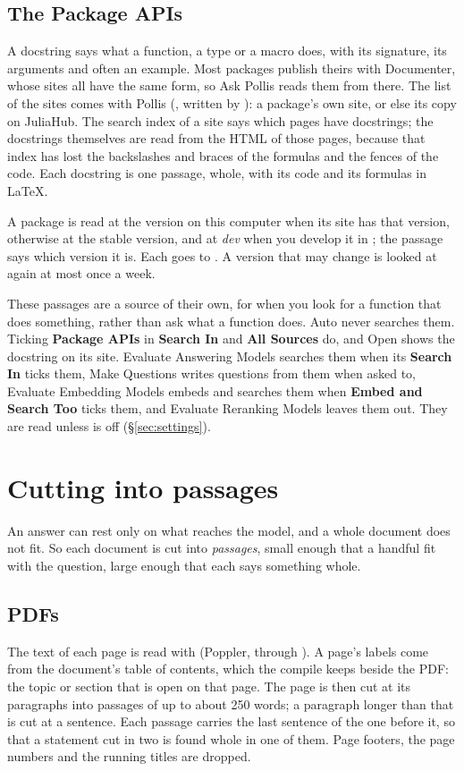 \subsection{The Package APIs}\label{sec:apis}
A docstring says what a function, a type or a macro does, with its signature, its arguments and often an example. Most
packages publish theirs with Documenter, whose sites all have the same form, so Ask Pollis reads them from there. The
list of the sites comes with Pollis (, written by ): a
package's own site, or else its copy on JuliaHub. The search index of a site says which pages have docstrings; the
docstrings themselves are read from the HTML of those pages, because that index has lost the backslashes and braces of
the formulas and the fences of the code. Each docstring is one passage, whole, with its code and its formulas in LaTeX.

A package is read at the version on this computer when its site has that version, otherwise at the stable version, and
at \emph{dev} when you develop it in ; the passage says which version it is. Each goes to
. A version that may change is looked at again at most once a week.

These passages are a source of their own, for when you look for a function that does something, rather than ask what
a function does. Auto never searches them. Ticking \textbf{Package APIs} in \textbf{Search In}
and \textbf{All Sources} do, and Open shows the docstring on its site. Evaluate Answering Models searches them when its
\textbf{Search In} ticks them, Make Questions writes questions from them when asked to, Evaluate Embedding Models
embeds and searches them when \textbf{Embed and Search Too} ticks them, and Evaluate Reranking Models leaves them out. They are read unless  is off (\S\ref{sec:settings}).

\section{Cutting into passages}\label{sec:passages}

An answer can rest only on what reaches the model, and a whole document does not fit. So each document is cut into
\emph{passages}, small enough that a handful fit with the question, large enough that each says something whole.

\subsection{PDFs}
The text of each page is read with  (Poppler, through ). A page's labels come from
the document's table of contents, which the compile keeps beside the PDF: the topic or section that is open on that
page. The page is then cut at its paragraphs into passages of up to about 250 words; a paragraph longer than that is
cut at a sentence. Each passage carries the last sentence of the one before it, so that a statement cut in two is
found whole in one of them. Page footers, the page numbers and the running titles are dropped.


